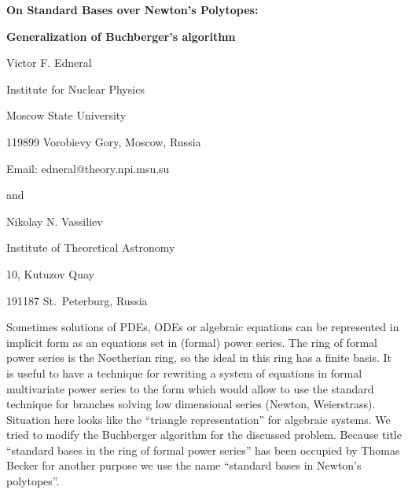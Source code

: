 

\centerline{\bf On Standard Bases over Newton's Polytopes:}
\centerline{\bf Generalization of Buchberger's algorithm}

\vskip 0.3cm

\centerline{Victor F. Edneral}
\centerline{Institute for Nuclear Physics}
\centerline{Moscow State University}
\centerline{119899 Vorobievy Gory, Moscow, Russia}
\centerline{Email: edneral@theory.npi.msu.su}
\centerline{and}
\centerline{Nikolay N. Vassiliev}
\centerline{Institute of Theoretical Astronomy}
\centerline{10, Kutuzov Quay}
\centerline{191187 St.\ Peterburg, Russia}

\vskip 0.3cm

  Sometimes solutions of PDEs, ODEs or algebraic equations can be
represented  in  implicit form as an equations  set  in  (formal)
power  series. The ring of formal power series is the  Noetherian
ring, so the ideal in this ring has a finite basis. It is  useful
to have a technique for rewriting a system of equations in formal
multivariate  power series to the form which would allow  to  use
the  standard  technique  for branches  solving  low  dimensional
series  (Newton,  Weierstrass).  Situation  here looks  like  the
``triangle  representation''  for algebraic systems.  We  tried  to
modify  the  Buchberger  algorithm  for  the  discussed  problem.
Because title ``standard bases in the ring of formal power series''
has been occupied by Thomas Becker for another purpose we use the
name ``standard bases in Newton's polytopes''.


